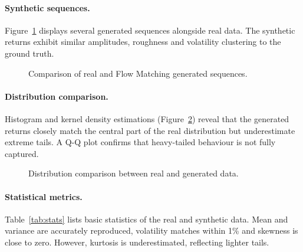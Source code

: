 \paragraph{Synthetic sequences.}  Figure~\ref{fig:fm_synth} displays
several generated sequences alongside real data.  The synthetic
returns exhibit similar amplitudes, roughness and volatility
clustering to the ground truth.

\begin{figure}[H]
  \centering
  \caption{Comparison of real and Flow Matching generated sequences.}
  \label{fig:fm_synth}
\end{figure}

\paragraph{Distribution comparison.}  Histogram and kernel density
estimations (Figure~\ref{fig:fm_dist}) reveal that the generated
returns closely match the central part of the real distribution but
underestimate extreme tails.  A Q-Q plot confirms that heavy-tailed
behaviour is not fully captured.

\begin{figure}[H]
  \centering
  \caption{Distribution comparison between real and generated data.}
  \label{fig:fm_dist}
\end{figure}

\paragraph{Statistical metrics.}  Table~\ref{tab:stats} lists basic
statistics of the real and synthetic data.  Mean and variance are
accurately reproduced, volatility matches within 1\% and skewness is
close to zero.  However, kurtosis is underestimated, reflecting
lighter tails.

